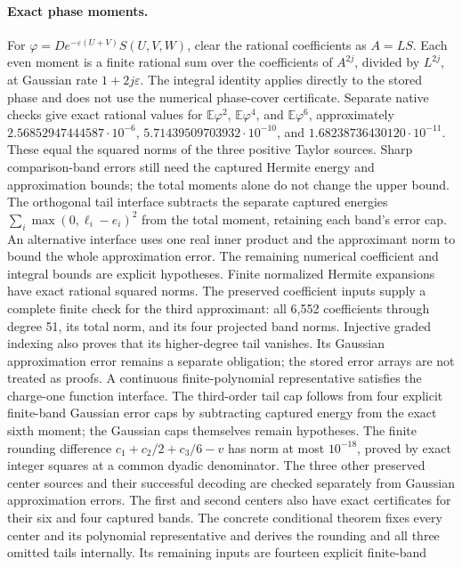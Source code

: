 \documentclass[11pt,a4paper]{article}
\newcommand{\E}{\mathbb{E}}
\begin{document}
\paragraph{Exact phase moments.}
For $\varphi=D e^{-\varepsilon(U+V)}S(U,V,W)$, clear the rational coefficients
as $A=LS$. Each even moment is a finite rational sum over the coefficients of
$A^{2j}$, divided by $L^{2j}$, at Gaussian rate $1+2j\varepsilon$.
The integral identity applies directly to the stored phase and does not use
the numerical phase-cover certificate. Separate native checks give exact
rational values for $\E\varphi^2$, $\E\varphi^4$, and $\E\varphi^6$,
approximately $2.56852947444587\cdot10^{-6}$,
$5.71439509703932\cdot10^{-10}$, and $1.68238736430120\cdot10^{-11}$.
These equal the squared norms of the three positive Taylor sources.
Sharp comparison-band errors still need the captured Hermite energy and
approximation bounds; the total moments alone do not change the upper bound.
The orthogonal tail interface subtracts the separate captured energies
$\sum_i\max(0,\ell_i-e_i)^2$ from the total moment, retaining each band's
error cap. An alternative interface uses one real inner product and the
approximant norm to bound the whole approximation error. The remaining
numerical coefficient and integral bounds are explicit hypotheses.
Finite normalized Hermite expansions have exact rational squared norms.
The preserved coefficient inputs supply a complete finite check for the third
approximant: all 6,552 coefficients through degree 51, its total norm, and its
four projected band norms. Injective graded indexing also proves that its
higher-degree tail vanishes. Its Gaussian approximation error remains a
separate obligation; the stored error arrays are not treated as proofs.
A continuous finite-polynomial representative satisfies the charge-one
function interface. The third-order tail cap follows from four explicit
finite-band Gaussian error caps by subtracting captured energy from the exact
sixth moment; the Gaussian caps themselves remain hypotheses.
The finite rounding difference $c_1+c_2/2+c_3/6-v$ has norm at most $10^{-18}$,
proved by exact integer squares at a common dyadic denominator. The three
other preserved center sources and their successful decoding are checked
separately from Gaussian approximation errors.
The first and second centers also have exact certificates for their six and
four captured bands. The concrete conditional theorem fixes every center and
its polynomial representative and derives the rounding and all three omitted
tails internally. Its remaining inputs are fourteen explicit finite-band
\end{document}
